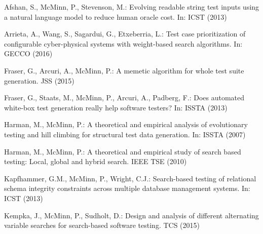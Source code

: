 \documentclass{llncs}
\newcommand{\inlineheading}[1]{\vspace{1mm} \noindent {\bf #1.}}
\begin{document}




%



\begin{thebibliography}{10}
\providecommand{\url}[1]{\texttt{#1}}
\providecommand{\urlprefix}{URL }

\scriptsize

Afshan, S., McMinn, P., Stevenson, M.: Evolving readable string test inputs
    using a natural language model to reduce human oracle cost. In: ICST (2013)

Arrieta, A., Wang, S., Sagardui, G., Etxeberria, L.: Test case prioritization
    of configurable cyber-physical systems with weight-based search algorithms.
    In: GECCO (2016)

Fraser, G., Arcuri, A., McMinn, P.: A memetic algorithm for whole test suite
    generation. JSS  (2015)

Fraser, G., Staats, M., McMinn, P., Arcuri, A., Padberg, F.: Does automated
    white-box test generation really help software testers? In: ISSTA (2013)

Harman, M., McMinn, P.: A theoretical and empirical analysis of evolutionary
    testing and hill climbing for structural test data generation. In: ISSTA
    (2007)

Harman, M., McMinn, P.: A theoretical and empirical study of search based
    testing: Local, global and hybrid search. IEEE TSE  (2010)

Kapfhammer, G.M., McMinn, P., Wright, C.J.: Search-based testing of relational
    schema integrity constraints across multiple database management systems. In:
    ICST (2013)

Kempka, J., McMinn, P., Sudholt, D.: Design and analysis of different
    alternating variable searches for search-based software testing. TCS  (2015)


\end{thebibliography}
\end{document}
